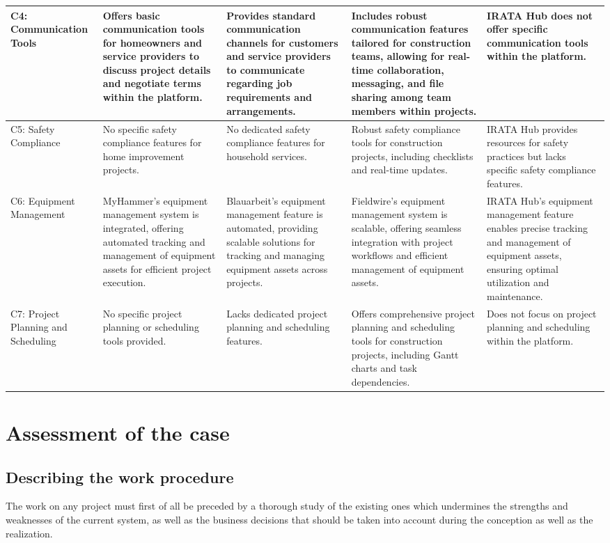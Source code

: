 \begin{longtable}{|p{2cm}|p{2cm}|p{2.5cm}|p{2.5cm}|p{2.5cm}|}
    C4: Communication Tools & Offers basic communication tools for homeowners and service providers to discuss project details and negotiate terms within the platform. & Provides standard communication channels for customers and service providers to communicate regarding job requirements and arrangements. & Includes robust communication features tailored for construction teams, allowing for real-time collaboration, messaging, and file sharing among team members within projects. & IRATA Hub does not offer specific communication tools within the platform. \\
    \hline
    C5: Safety Compliance & No specific safety compliance features for home improvement projects. & No dedicated safety compliance features for household services. & Robust safety compliance tools for construction projects, including checklists and real-time updates. & IRATA Hub provides resources for safety practices but lacks specific safety compliance features. \\
    \hline
    C6: Equipment Management & MyHammer's equipment management system is integrated, offering automated tracking and management of equipment assets for efficient project execution. & Blauarbeit's equipment management feature is automated, providing scalable solutions for tracking and managing equipment assets across projects. & Fieldwire's equipment management system is scalable, offering seamless integration with project workflows and efficient management of equipment assets. & IRATA Hub's equipment management feature enables precise tracking and management of equipment assets, ensuring optimal utilization and maintenance. \\
    \hline
    C7: Project Planning and Scheduling & No specific project planning or scheduling tools provided. & Lacks dedicated project planning and scheduling features. & Offers comprehensive project planning and scheduling tools for construction projects, including Gantt charts and task dependencies. & Does not focus on project planning and scheduling within the platform. \\
    \hline
\end{longtable}

\section{Assessment of the case}
\subsection{Describing the work procedure}
The work on any project must first of all be preceded by a thorough study of the existing ones which undermines the strengths and weaknesses of the current system, as well as the business decisions that should be taken into account during the conception as well as the realization.

